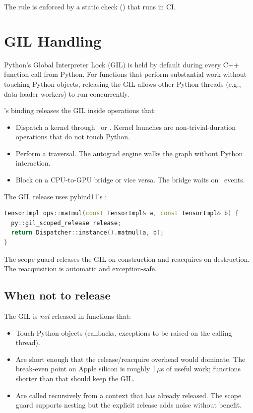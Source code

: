 The rule is enforced by a static check
() that runs in CI.

\section{GIL Handling}
\label{sec:python_cpp_binding:gil}

Python's Global Interpreter Lock (GIL) is held by default during
every C++ function call from Python. For functions that perform
substantial work without touching Python objects, releasing the
GIL allows other Python threads (e.g., data-loader workers) to run
concurrently.

\Lucid's binding releases the GIL inside operations that:

\begin{itemize}
  \item Dispatch a kernel through \MLX\ or \Accelerate. Kernel
    launches are non-trivial-duration operations that do not touch
    Python.
  \item Perform a  traversal. The autograd engine
    walks the graph without Python interaction.
  \item Block on a CPU-to-GPU bridge or vice versa. The bridge
    waits on \Metal\ events.
\end{itemize}

The GIL release uses pybind11's :

\begin{lstlisting}[style=lucidcpp,language=C++]
TensorImpl ops::matmul(const TensorImpl& a, const TensorImpl& b) {
  py::gil_scoped_release release;
  return Dispatcher::instance().matmul(a, b);
}
\end{lstlisting}

The scope guard releases the GIL on construction and reacquires on
destruction. The reacquisition is automatic and exception-safe.

\subsection{When not to release}
\label{ssec:python_cpp_binding:no_release}

The GIL is \emph{not} released in functions that:

\begin{itemize}
  \item Touch Python objects (callbacks, exceptions to be raised
    on the calling thread).
  \item Are short enough that the release/reacquire overhead would
    dominate. The break-even point on Apple silicon is roughly
    1\,$\mu$s of useful work; functions shorter than that should
    keep the GIL.
  \item Are called recursively from a context that has already
    released. The scope guard supports nesting but the explicit
    release adds noise without benefit.
\end{itemize}

